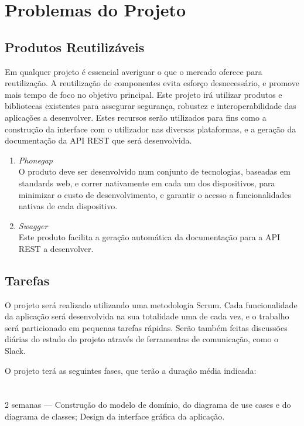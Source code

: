 \documentclass{article}
\begin{document}
\section{Problemas do Projeto}
  
  \subsection{Produtos Reutilizáveis}

  Em qualquer projeto é essencial averiguar o que o mercado oferece para reutilização. A reutilização de componentes evita esforço desnecessário, e promove mais tempo de foco no objetivo principal. Este projeto irá utilizar produtos e bibliotecas existentes para assegurar segurança, robustez e interoperabilidade das aplicações a desenvolver. Estes recursos serão utilizados para fins como a construção da interface com o utilizador nas diversas plataformas, e a geração da documentação da API REST que será desenvolvida.

  \begin{enumerate}
   \item \emph{Phonegap}\\
          O produto deve ser desenvolvido num conjunto de tecnologias, baseadas em standards web, e correr nativamente em cada um dos dispositivos, para minimizar o custo de desenvolvimento, e garantir o acesso a funcionalidades nativas de cada dispositivo.
   \item \emph{Swagger}\\
          Este produto facilita a geração automática da documentação para a API REST a desenvolver.
  \end{enumerate}

  \subsection{Tarefas}

    O projeto será realizado utilizando uma metodologia Scrum. Cada funcionalidade da aplicação será desenvolvida na sua totalidade uma de cada vez, e o trabalho será particionado em pequenas tarefas rápidas. Serão também feitas discussões diárias do estado do projeto através de ferramentas de comunicação, como o Slack.

    O projeto terá as seguintes fases, que terão a duração média indicada:

\paragraph{}
    \textbf{} \\
    2 semanas --- Construção do modelo de domínio, do diagrama de use cases e do diagrama de classes; Design da interface gráfica da aplicação.
\end{document}
